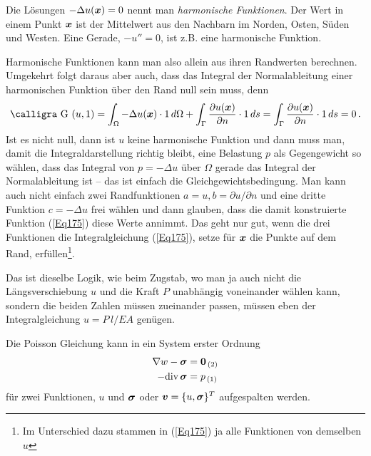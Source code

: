 Die L\"{o}sungen $- \Delta u(\mbox{\boldmath $x$}) = 0$ nennt man {\em harmonische Funktionen\/}. Der Wert in einem Punkt $\mbox{\boldmath $x$} $ ist der Mittelwert  aus den Nachbarn im Norden, Osten, S\"{u}den und Westen. Eine Gerade, $- u'' = 0$, ist z.B. eine harmonische Funktion.

Harmonische Funktionen kann man also allein aus ihren Randwerten berechnen. Umgekehrt folgt daraus aber auch,  dass das Integral der Normal\-ab\-leitung einer harmonischen Funktion \"{u}ber den Rand null sein muss, denn
\begin{align}
\text{\normalfont\calligra G\,\,}(u,1) = \int_{\Omega} - \Delta u(\vek x)\cdot 1\,d\Omega + \int_{\Gamma} \frac{\partial u(\vek x)}{\partial n} \cdot 1\,ds =  \int_{\Gamma} \frac{\partial u(\vek x)}{\partial n} \cdot 1\,ds = 0\,.
\end{align}
Ist es nicht null, dann ist $u$ keine harmonische Funktion und dann muss man, damit die Integraldarstellung richtig bleibt, eine Belastung $p$ als \glq Gegengewicht\grq{} so w\"{a}hlen, dass das Integral von $p = - \Delta u$ \"{u}ber $\Omega$ gerade das Integral der Normalableitung ist -- das ist einfach die Gleichgewichtsbedingung. Man kann auch nicht einfach zwei Randfunktionen $a = u, b = \partial u/\partial n$ und eine dritte Funktion $c = - \Delta u$ frei w\"{a}hlen und dann glauben, dass die damit konstruierte Funktion (\ref{Eq175}) diese Werte annimmt. Das geht nur gut, wenn die drei Funktionen die Integralgleichung (\ref{Eq175}), setze f\"{u}r $\mbox{\boldmath $x$}$ die Punkte auf dem Rand, erf\"{u}llen\footnote{Im Unterschied dazu stammen in (\ref{Eq175}) ja alle Funktionen von demselben $u$}.

Das ist dieselbe Logik, wie beim Zugstab, wo man ja auch nicht die L\"{a}ngsverschiebung $u $ und die Kraft $P$ unabh\"{a}ngig voneinander w\"{a}hlen kann, sondern die beiden Zahlen m\"{u}ssen zueinander passen, m\"{u}ssen eben der \glq Integralgleichung\grq{} $u = P\,l/EA$ gen\"{u}gen.

Die Poisson Gleichung kann in ein System erster Ordnung
\begin{subequations}
\begin{align}
\nabla w - \mbox{\boldmath $\sigma$} &= \mbox{\boldmath $0$}_{\,(2)}  \\
- \text{div} \,\mbox{\boldmath $\sigma$} &= p_{\,(1)}
\end{align}
\end{subequations}
f\"{u}r zwei Funktionen, $u$ und $\mbox{\boldmath $\sigma$}$ oder $\mbox{\boldmath $v$} = \{u, \mbox{\boldmath $\sigma$}\}^T$ aufgespalten werden.

